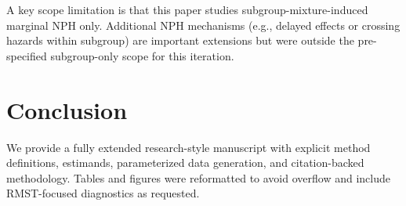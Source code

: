 \documentclass[11pt]{article}
\begin{document}
A key scope limitation is that this paper studies subgroup-mixture-induced marginal NPH only. Additional NPH mechanisms (e.g., delayed effects or crossing hazards within subgroup) are important extensions but were outside the pre-specified subgroup-only scope for this iteration.

\section{Conclusion}
We provide a fully extended research-style manuscript with explicit method definitions, estimands, parameterized data generation, and citation-backed methodology. Tables and figures were reformatted to avoid overflow and include RMST-focused diagnostics as requested.



\end{document}
